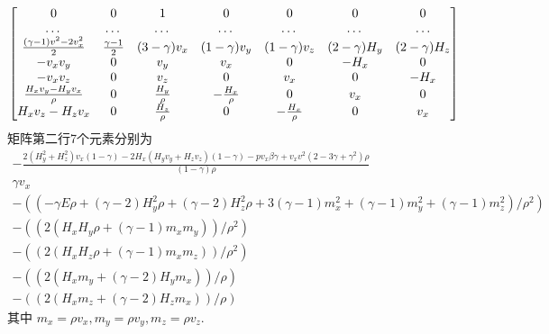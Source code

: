 \documentclass[10.5pt
]{article}
\begin{document}
\begin{equation}
   \mqty[
0  &  0  &  1  &  0  &  0  &  0  &  0 \\
\dots  &  \dots  &  \dots  &  \dots  &  \dots  &  \dots  &  \dots \\
\frac{(\gamma-1) v^2-2v_x^2}{2 }  &  \frac{\gamma-1}{2}  &  (3-\gamma) v_x  & (1-\gamma) v_y  &  (1-\gamma) v_z  &  (2-\gamma) H_y  &  (2-\gamma) H_z \\
-v_x v_y  &  0  &  v_y  &  v_x  &  0  &  -H_x  &  0 \\
-v_x v_z  &  0  &  v_z  &  0  &  v_x  &  0  &  -H_x \\
\frac{H_x v_y-H_y v_x}{\rho}  &  0  &  \frac{H_y}{\rho}  &  -\frac{H_x}{\rho}  &  0  &  v_x  &  0 \\
H_x v_z-H_z v_x  &  0  &  \frac{H_z}{\rho}  &  0  &  -\frac{H_x}{\rho}  &  0  &  v_x ]
\label{eq:Lax-Wendroff-A}
\end{equation}
矩阵第二行7个元素分别为
\begin{subequations}
	\begin{gather}
-\frac{2 (H_y^2+H_z^2) v_x (1- \gamma) -2 H_x (H_y v_y+H_z v_z )(1 - \gamma) - p v_x \beta \gamma + v_x v^2 (2 - 3 \gamma + \gamma^2) \rho}{(1 - \gamma) \rho}\\
  \gamma v_x   \\
  -((-\gamma E \rho+(\gamma-2) H_y^2 \rho+(\gamma-2) H_z^2 \rho+3 (\gamma-1) m_x^2+(\gamma-1) m_y^2+(\gamma-1) m_z^2)/\rho^2)   \\
  -((2 (H_x H_y \rho+(\gamma-1) m_x m_y))/\rho^2)   \\
  -((2 (H_x H_z \rho+(\gamma-1) m_x m_z))/\rho^2)   \\
  -((2 (H_x m_y+(\gamma-2) H_y m_x))/\rho)   \\
  -((2 (H_x m_z+(\gamma-2) H_z m_x))/\rho) 
\end{gather}
\end{subequations}
其中
$ m_x = \rho v_x,
m_y = \rho v_y,
m_z = \rho v_z.$
\end{document}
